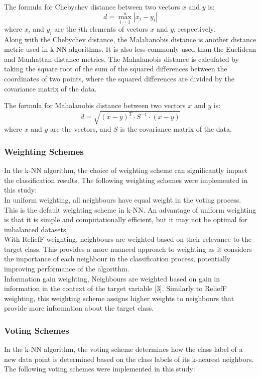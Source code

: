 The formula for Chebychev distance between two vectors \(x\) and \(y\) is:
\[ d = \max_{i=1}^{n} |x_i - y_i| \]
where \(x_i\) and \(y_i\) are the \(i\)th elements of vectors \(x\) and \(y\), respectively.\\

Along with the Chebychev distance, the Malahanobis distance is another distance metric used in k-NN algorithms.
It is also less commonly used than the Euclidean and Manhattan distance metrics.
The Mahalanobis distance is calculated by taking the square root of the sum of the squared differences between the coordinates of two points,
where the squared differences are divided by the covariance matrix of the data.

The formula for Mahalanobis distance between two vectors \(x\) and \(y\) is:
\[ d = \sqrt{(x - y)^T \cdot S^{-1} \cdot (x - y)} \]
where \(x\) and \(y\) are the vectors, and \(S\) is the covariance matrix of the data.\\

\subsubsection*{Weighting Schemes}
In the k-NN algorithm, the choice of weighting scheme can significantly impact the classification results.
The following weighting schemes were implemented in this study:\\

In uniform weighting, all neighbours have equal weight in the voting process.
This is the default weighting scheme in k-NN.
An advantage of uniform weighting is that it is simple and computationally efficient, but it may not be optimal for imbalanced datasets.\\

With ReliefF weighting, neighbours are weighted based on their relevance to the target class.
This provides a more nuanced approach to weighting as it considers the importance of each neighbour in the classification process, potentially
improving performance of the algorithm.\\

Information gain weighting, Neighbours are weighted based on gain in information in the context of the target variable [3].
Similarly to ReliefF weighting, this weighting scheme assigns higher weights to neighbours that provide more information about the target class.\\

\subsubsection*{Voting Schemes}
In the k-NN algorithm, the voting scheme determines how the class label of a new data point is determined based on the class labels of its k-nearest neighbors.
The following voting schemes were implemented in this study:\\

